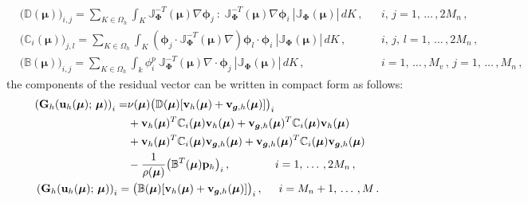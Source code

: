 \documentclass[12pt, a4paper, twoside, openright]{report}
\numberwithin{equation}{chapter}
\theoremstyle{theorem}
\theoremstyle{definition}
\theoremstyle{remark}
\theoremstyle{proposition}
\numberwithin{figure}{chapter}
\newcommand{\bg}[1]{\boldsymbol{#1}}
\begin{document}
		\begin{subequations}
			\begin{align}
				& \big( \mathbb{D}(\bg{\mu}) \big)_{i,j} = \sum_{K \in \Omega_h} \int_K \mathbb{J}_{\bg{\Phi}}^{-T}(\bg{\mu}) \nabla \bg{\phi}_j ~ : ~ \mathbb{J}_{\bg{\Phi}}^{-T}(\bg{\mu}) \nabla \bg{\phi}_i ~ |\mathbb{J}_{\bg{\Phi}}(\bg{\mu})| \, dK \, , && i, \, j = 1, \, \ldots \, , 2 M_n \, , \\
				& \big( \mathbb{C}_i(\bg{\mu}) \big)_{j,l} = \sum_{K \in \Omega_h} \int_K \left( \bg{\phi}_j \cdot \mathbb{J}_{\bg{\Phi}}^{-T}(\bg{\mu}) \nabla \right) \bg{\phi}_l \cdot \bg{\phi}_i ~ |\mathbb{J}_{\bg{\Phi}}(\bg{\mu})| \, dK \, , && i, \, j, \, l = 1, \, \ldots \, , 2 M_n \, , \\
				& \big( \mathbb{B}(\bg{\mu}) \big)_{i,j} = \sum_{K \in \Omega_h} \int_k \phi_i^p ~ \mathbb{J}_{\bg{\Phi}}^{-T}(\bg{\mu}) \nabla \cdot \bg{\phi}_j ~ |\mathbb{J}_{\bg{\Phi}}(\bg{\mu})| \, dK \, , && i = 1, \, \ldots \, , M_v \, , \, j = 1, \, \ldots \, , M_n \, ,
			\end{align}
		\end{subequations}
		the components of the residual vector can be written in compact form as follows:
		\begin{subequations}
			\begin{align}
				&
				\begin{aligned}
					\left( \mathbf{G}_h(\mathbf{u}_h(\bg{\mu}); \, \bg{\mu}) \right)_i = & \nu(\bg{\mu}) \big( \mathbb{D}(\bg{\mu}) [ \mathbf{v}_h(\bg{\mu}) + \mathbf{v}_{\bg{g},h}(\bg{\mu}) ] \big)_i \\
					& + \mathbf{v}_h(\bg{\mu})^T \mathbb{C}_i(\bg{\mu}) \mathbf{v}_h(\bg{\mu}) + \mathbf{v}_{\bg{g},h} (\bg{\mu})^T \mathbb{C}_i(\bg{\mu}) \mathbf{v}_h(\bg{\mu}) \\
					& + \mathbf{v}_h(\bg{\mu})^T \mathbb{C}_i(\bg{\mu}) \mathbf{v}_{\bg{g},h}(\bg{\mu}) + \mathbf{v}_{\bg{g},h}(\bg{\mu})^T \mathbb{C}_i(\bg{\mu}) \mathbf{v}_{\bg{g},h}(\bg{\mu}) \\
					& - \dfrac{1}{\rho(\bg{\mu})} \big( \mathbb{B}^T(\bg{\mu}) \mathbf{p}_h \big)_i \, , \hspace*{1.4cm} i = 1, \, \ldots \, , 2 M_n \, ,
				\end{aligned} \\
				& \left( \mathbf{G}_h(\mathbf{u}_h(\bg{\mu}); \, \bg{\mu}) \right)_i = \big( \mathbb{B}(\bg{\mu}) [ \mathbf{v}_h(\bg{\mu}) + \mathbf{v}_{\bg{g},h}(\bg{\mu}) ] \big)_i \, , \hspace*{0.5cm} i = M_n + 1, \, \ldots \, , M \, .
			\end{align}
		\end{subequations}
\end{document}
